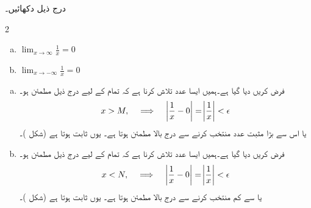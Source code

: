 درج ذیل دکھائیں۔
\begin{multicols}{2}
\begin{enumerate}[a.]
\item
$\lim_{x\to\infty}\frac{1}{x}=0$
\item
$\lim_{x\to -\infty}\frac{1}{x}=0$
\end{enumerate}
\end{multicols}
\begin{enumerate}[a.]
\item
فرض کریں  دیا گیا ہے۔ہمیں ایسا عدد  تلاش کرنا ہے کہ تمام  کے لیے درج ذیل مطمئن ہو۔
\begin{align*}
x>M,\quad \implies \quad \abs{\frac{1}{x}-0}=\abs{\frac{1}{x}}<\epsilon
\end{align*}
 یا اس سے بڑا مثبت عدد منتخب کرنے سے درج بالا مطمئن ہوتا ہے۔ یوں  ثابت ہوتا ہے (شکل )۔
\item
فرض کریں  دیا گیا ہے۔ہمیں ایسا عدد  تلاش کرنا ہے کہ تمام  کے لیے درج ذیل مطمئن ہو۔
\begin{align*}
x<N,\quad \implies \quad \abs{\frac{1}{x}-0}=\abs{\frac{1}{x}}<\epsilon
\end{align*}
 یا  سے کم منتخب کرنے سے درج بالا مطمئن ہوتا ہے۔ یوں  ثابت ہوتا ہے (شکل )۔
\end{enumerate}
%
